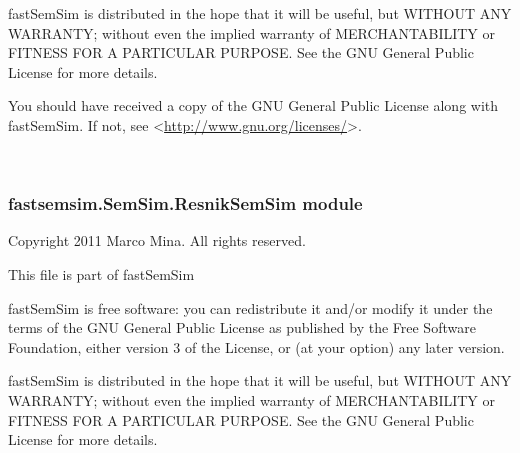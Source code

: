 \documentclass[letterpaper,10pt,english]{sphinxmanual}
\begin{document}
fastSemSim is distributed in the hope that it will be useful,
but WITHOUT ANY WARRANTY; without even the implied warranty of
MERCHANTABILITY or FITNESS FOR A PARTICULAR PURPOSE.  See the
GNU General Public License for more details.

You should have received a copy of the GNU General Public License
along with fastSemSim.  If not, see \textless{}\href{http://www.gnu.org/licenses/}{http://www.gnu.org/licenses/}\textgreater{}.

\begin{fulllineitems}
\label{fastsemsim.SemSim:fastsemsim.SemSim.ObjSetSemSim.ObjSetSemSim}~

\begin{fulllineitems}
\label{fastsemsim.SemSim:fastsemsim.SemSim.ObjSetSemSim.ObjSetSemSim.SemSim}
\end{fulllineitems}


\end{fulllineitems}



\subsubsection{fastsemsim.SemSim.ResnikSemSim module}
\label{fastsemsim.SemSim:module-fastsemsim.SemSim.ResnikSemSim}\label{fastsemsim.SemSim:fastsemsim-semsim-resniksemsim-module}
Copyright 2011 Marco Mina. All rights reserved.

This file is part of fastSemSim

fastSemSim is free software: you can redistribute it and/or modify
it under the terms of the GNU General Public License as published by
the Free Software Foundation, either version 3 of the License, or
(at your option) any later version.

fastSemSim is distributed in the hope that it will be useful,
but WITHOUT ANY WARRANTY; without even the implied warranty of
MERCHANTABILITY or FITNESS FOR A PARTICULAR PURPOSE.  See the
GNU General Public License for more details.
\end{document}
